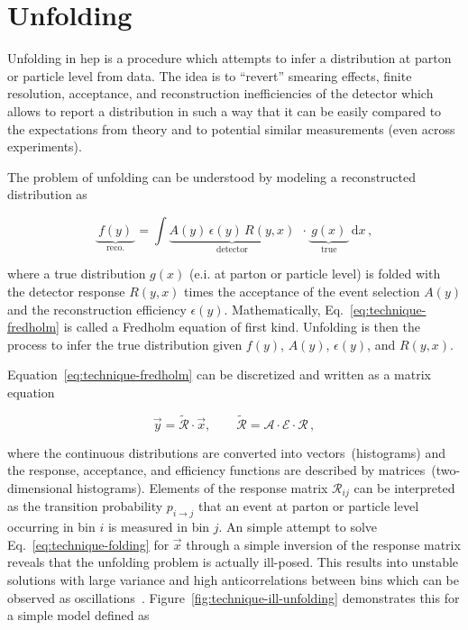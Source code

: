 \section{Unfolding}

Unfolding in \gls{hep} is a procedure which attempts to infer a distribution at parton or particle level from data. The idea is to ``revert'' smearing effects, finite resolution, acceptance, and reconstruction inefficiencies of the detector which allows to report a distribution in such a way that it can be easily compared to the expectations from theory and to potential similar measurements (even across experiments). 

The problem of unfolding can be understood by modeling a reconstructed distribution as 

\begin{equation}
\underbrace{~f(y)~}_\mathrm{reco.}=\int \underbrace{A(y)\,\epsilon(y)\, R(y,x)}_\mathrm{detector}~~\cdot \underbrace{~g(x)~}_\mathrm{true}\, \mathrm{d}x\,, \label{eq:technique-fredholm}
\end{equation}

where a true distribution $g(x)$ (e.i. at parton or particle level) is folded with the detector response $R(y,x)$ times the acceptance of the event selection $A(y)$ and the reconstruction efficiency $\epsilon(y)$. Mathematically, Eq.~\ref{eq:technique-fredholm} is called a Fredholm equation of first kind. Unfolding is then the process to infer the true distribution given $f(y)$, $A(y)$, $\epsilon(y)$, and $R(y,x)$. 

Equation~\ref{eq:technique-fredholm} can be discretized and written as a matrix equation

\begin{equation}
\vec{y} = \widetilde{\mathcal{R}}\cdot\vec{x},\qquad \widetilde{\mathcal{R}}=\mathcal{A}\cdot\mathcal{E}\cdot\mathcal{R}\,, \label{eq:technique-folding}
\end{equation}

where the continuous distributions are converted into vectors~(histograms) and the response, acceptance, and efficiency functions are described by matrices~(two-dimensional histograms). Elements of the response matrix $\mathcal{R}_{ij}$ can be interpreted as the transition probability $p_{i\to j}$ that an event at parton or particle level occurring in bin $i$ is measured in bin $j$. An simple attempt to solve Eq.~\ref{eq:technique-folding} for $\vec{x}$ through a simple inversion of the response matrix reveals that the unfolding problem is actually ill-posed. This results into unstable solutions with large variance and high anticorrelations between bins which can be observed as oscillations~\cite{Cowan:2002in}. Figure~\ref{fig:technique-ill-unfolding} demonstrates this for a simple model defined as

